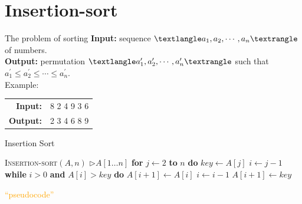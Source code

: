 \documentclass{beamer}
\begin{document}
\section{Insertion-sort}

\begin{frame}{The problem of sorting}
    \textbf{Input:} sequence $\textlangle a_1, a_2, \cdots, a_n \textrangle$ of numbers.\\
    \textbf{Output:} permutation $\textlangle a^{\prime}_1, a^{\prime}_2, \cdots, a^{\prime}_n \textrangle$ such that $a^{\prime}_1 \leq a^{\prime}_2 \leq \cdots \leq a^{\prime}_n$.\\
    \vspace{10mm}
    Example:\\
    \begin{tabular}{r r}
        \textbf{Input:}     & 8 2 4 9 3 6 \\
        \textbf{Output:}  & 2 3 4 6 8 9
    \end{tabular}
\end{frame}

\begin{frame}{Insertion Sort}
    \begin{algorithm}[H]
        \caption{Insertion Sort}
        \begin{algorithmic}[1]
            \STATE \textsc{Insertion-sort}$(A, n)$ \hspace{5mm} $\rhd A[1 \ldots n]$ 
            \STATE \hspace{1em} \textbf{for} $j \leftarrow 2$ \textbf{to} $n$ \textbf{do}
            \STATE \hspace{2em} $key \leftarrow A[j]$
            \STATE \hspace{2em} $i \leftarrow j - 1$
            \STATE \hspace{2em} \textbf{while} $i > 0$ \textbf{and} $A[i] > key$ \textbf{do}
            \STATE \hspace{3em} $A[i + 1] \leftarrow A[i]$
            \STATE \hspace{3em} $i \leftarrow i - 1$
            \STATE \hspace{2em} $A[i + 1] \leftarrow key$
        \end{algorithmic}
    \end{algorithm}
    
    \centering
    \Large \textcolor{orange}{``pseudocode''}
\end{frame}
\end{document}
